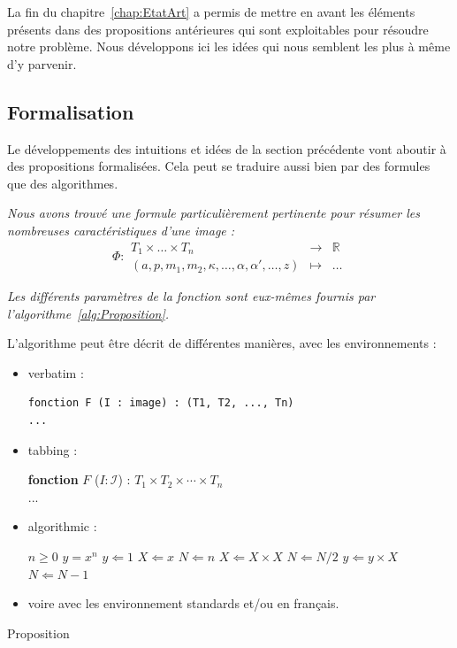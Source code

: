 \documentclass[11pt, french]{report-rd-info}
\begin{document}
La fin du chapitre~\ref{chap:EtatArt} a permis de mettre en avant les éléments présents dans des propositions antérieures qui sont exploitables pour résoudre notre problème. Nous développons ici les idées qui nous semblent les plus à même d'y parvenir.

\subsection{Formalisation}

Le développements des intuitions et idées de la section précédente vont aboutir à des propositions formalisées. Cela peut se traduire aussi bien par des formules que des algorithmes.

\emph{Nous avons trouvé une formule particulièrement pertinente pour résumer les nombreuses caractéristiques d'une image :}
\begin{equation}
	\label{eq:Proposition}
	\Phi :
		\begin{array}{ccc}
			T_1 \times \ldots \times T_n & \to & \mathbb{R}\\
			(a, p, m_1, m_2, \kappa, \ldots, \alpha, \alpha', \ldots,z) & \mapsto & \ldots
		\end{array}
\end{equation}

\emph{Les différents paramètres de la fonction sont eux-mêmes fournis par l'algorithme~\ref{alg:Proposition}.}

\begin{algorithm*}
	L'algorithme peut être décrit de différentes manières, avec les environnements :
	\begin{itemize}
		\item verbatim :
			\begin{verbatim}
fonction F (I : image) : (T1, T2, ..., Tn)
...
			\end{verbatim}
		\item tabbing :
			\begin{tabbing}
				\textbf{fonction} $F$ ($I : \mathcal{I}$) : $T_1 \times T_2 \times \cdots \times T_n$\\
				...
			\end{tabbing}
		\item algorithmic :
			\begin{algorithmic}[1]
				\REQUIRE $n \geq 0$
				\ENSURE $y = x^n$
				\STATE $y \Leftarrow 1$
				\STATE $X \Leftarrow x$
				\STATE $N \Leftarrow n$
						\STATE $X \Leftarrow X \times X$
						\STATE $N \Leftarrow N / 2$
					\ELSE[$N$ is odd]
						\STATE $y \Leftarrow y \times X$
						\STATE $N \Leftarrow N - 1$
					\ENDIF
				\ENDWHILE
			\end{algorithmic}
		\item voire avec les environnement standards et/ou en français.
	\end{itemize}
	\caption{Proposition}
	\label{alg:Proposition}
\end{algorithm*}
\end{document}
